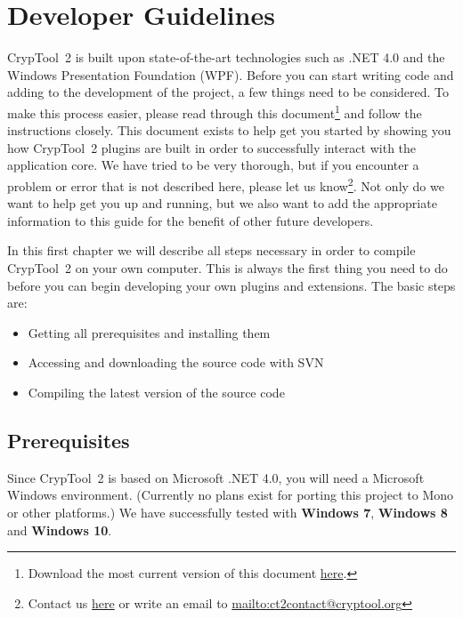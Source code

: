 \chapter{Developer Guidelines}
\label{DeveloperGuidelines}

CrypTool~2 is built upon state-of-the-art technologies such as .NET 4.0 and the Windows Presentation Foundation (WPF). Before you can start writing code and adding to the development of the project, a few things need to be considered. To make this process easier, please read through this document\footnote{Download the most current version of this document \href{https://www.cryptool.org/trac/CrypTool2/browser/trunk/Documentation/PluginHowTo/HowToDeveloper.pdf}{here}.} and follow the instructions closely. This document exists to help get you started by showing you how CrypTool~2 plugins are built in order to successfully interact with the application core. We have tried to be very thorough, but if you encounter a problem or error that is not described here, please let us know\footnote{Contact us \href{https://www.cryptool.org/trac/CrypTool2/wiki/DiscussionGroups}{here} or write an email to \url{mailto:ct2contact@cryptool.org}}. Not only do we want to help get you up and running, but we also want to add the appropriate information to this guide for the benefit of other future developers.

In this first chapter we will describe all steps necessary in order to compile CrypTool~2 on your own computer. This is always the first thing you need to do before you can begin developing your own plugins and extensions. The basic steps are:
\begin{itemize}
	\item Getting all prerequisites and installing them
	\item Accessing and downloading the source code with SVN
	\item Compiling the latest version of the source code
\end{itemize}

\section{Prerequisites}
\label{Prerequisites}

Since CrypTool~2 is based on Microsoft .NET 4.0, you will need a Microsoft Windows environment. (Currently no plans exist for porting this project to Mono or other platforms.) We have successfully tested with \textbf{Windows 7}, \textbf{Windows 8} and \textbf{Windows 10}.

